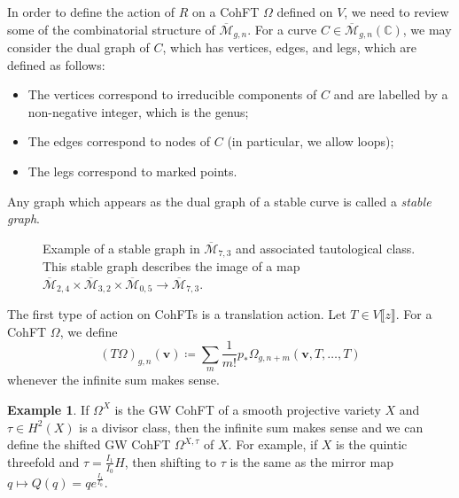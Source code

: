 \documentclass{amsart}
\theoremstyle{definition}
\newtheorem{exm}[thm]{Example}
\theoremstyle{remark}
\theoremstyle{plain}
\theoremstyle{definition}
\theoremstyle{remark}
\newcommand{\C}{\mathbb{C}}
\newcommand{\Mbar}{\overline{\mathcal{M}}}
\newcommand{\mc}[1]{\mathcal{#1}}
\newcommand{\mbf}[1]{\mathbf{#1}}
\newcommand{\bv}{\mbf{v}}
\newcommand{\ol}[1]{\overline{#1}}
\newcommand{\1}{\mathbf{1}}
\newcommand{\2}{\mathbf{2}}
\newcommand{\3}{\mathbf{3}}
\newcommand{\ps}[1]{\llbracket #1 \rrbracket}
\begin{document}
In order to define the action of $R$ on a CohFT $\Omega$ defined on $V$, we need to review some of the combinatorial structure of $\Mbar_{g,n}$. For a curve $C\in \Mbar_{g,n}(\C)$, we may consider the dual graph of $C$, which has vertices, edges, and legs, which are defined as follows:
\begin{itemize}
    \item The vertices correspond to irreducible components of $C$ and are labelled by a non-negative integer, which is the genus;
    \item The edges correspond to nodes of $C$ (in particular, we allow loops);
    \item The legs correspond to marked points.
\end{itemize}
Any graph which appears as the dual graph of a stable curve is called a \textit{stable graph}.

\begin{figure}[htpb]
  \centering
  \caption{Example of a stable graph in $\ol{\mc{M}}_{7,3}$ and associated tautological class. This stable graph describes the image of a map
    $\ol{\mc{M}}_{2,4} \times \ol{\mc{M}}_{3,2} \times \ol{\mc{M}}_{0,5} \to \ol{\mc{M}}_{7,3}$.}
  \label{fig:stablegraph}
\end{figure}

The first type of action on CohFTs is a translation action. Let $T \in V\ps{z}$. For a CohFT $\Omega$, we define
\[ (T\Omega)_{g,n}(\bv) \coloneqq \sum_m \frac{1}{m!} p_* \Omega_{g,n+m}(\bv, T,\ldots,T) \]
whenever the infinite sum makes sense.

\begin{exm}
    If $\Omega^X$ is the GW CohFT of a smooth projective variety $X$ and $\tau \in H^2(X)$ is a divisor class, then the infinite sum makes sense and we can define the shifted GW CohFT $\Omega^{X,\tau}$ of $X$. For example, if $X$ is the quintic threefold and $\tau = \frac{I_1}{I_0} H$, then shifting to $\tau$ is the same as the mirror map $q \mapsto Q(q) = q e^{\frac{I_1}{I_0}}$.
\end{exm}
\end{document}
